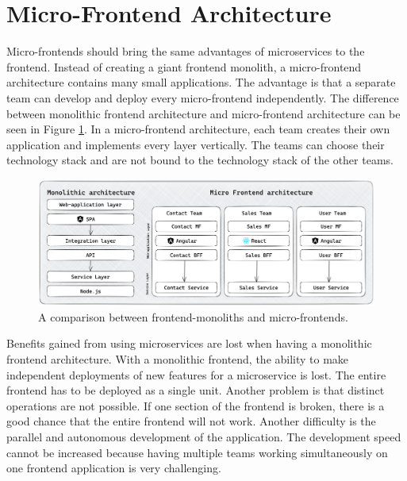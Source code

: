 \section{Micro-Frontend Architecture}\label{section:background:micro-frontend-architecture}

Micro-frontends should bring the same advantages of microservices to the frontend. Instead of creating a giant frontend monolith, a micro-frontend architecture contains many small applications. The advantage is that a separate team can develop and deploy every micro-frontend independently. \cite{book:2020:geers:background:micro-frontends:micro-frontends-in-action} The difference between monolithic frontend architecture and micro-frontend architecture can be seen in Figure \ref{fig:background:micro-frontend:monolith-micro-frontend-comparison}. In a micro-frontend architecture, each team creates their own application and implements every layer vertically. The teams can choose their technology stack and are not bound to the technology stack of the other teams.

\ifshowImages
\begin{figure}[H]
  \centering
  \includegraphics[width=0.9\linewidth]{images/background/micro-frontends/monolith-micro-frontends-comparison.png}
  \caption{A comparison between frontend-monoliths and micro-frontends.}\label{fig:background:micro-frontend:monolith-micro-frontend-comparison}
\end{figure}
\fi

\noindent Benefits gained from using microservices are lost when having a monolithic frontend architecture. With a monolithic frontend, the ability to make independent deployments of new features for a microservice is lost. The entire frontend has to be deployed as a single unit. Another problem is that distinct operations are not possible. If one section of the frontend is broken, there is a good chance that the entire frontend will not work. Another difficulty is the parallel and autonomous development of the application. The development speed cannot be increased because having multiple teams working simultaneously on one frontend application is very challenging. \cite{misc:2019:leitner:background:micro-frontends:micro-frontends-basics}

